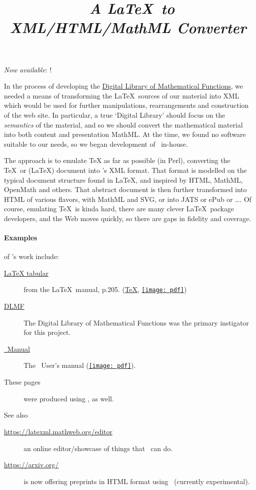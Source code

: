 \documentclass{article}
\title{\LaTeXML\ \emph{A \LaTeX\ to XML/HTML/MathML Converter}}
\newcommand{\PDFIcon}{\texttt{[image: pdf]}}
\begin{document}
\label{top}
\maketitle

\emph{Now available}:  !

In the process of developing the
\href{https://dlmf.nist.gov/}{Digital Library of Mathematical Functions},
we needed a means of transforming
the \LaTeX\ sources of our material into XML which would be used
for further manipulations, rearrangements and construction of the web site.
In particular, a true `Digital Library' should focus on the \emph{semantics}
of the material, and so we should convert the mathematical material into both
content and presentation MathML.
At the time, we found no software suitable to our needs, so we began
development of \LaTeXML\ in-house.  

The approach is to emulate TeX as far as possible (in Perl), converting
the \TeX\ or (\LaTeX) document into \LaTeXML's XML format. That format
is modelled on the typical document structure found in \LaTeX, and inspired by
HTML, MathML, OpenMath and others.  That abstract document is then further
transformed into HTML of various flavors, with MathML and SVG,
or into JATS or ePub or \ldots.
Of course, emulating \TeX\ is kinda hard,
there are many clever \LaTeX\ package developers,
and the Web moves quickly,
so there are gaps in fidelity and coverage.

\paragraph*{Examples} of \LaTeXML's work include:
%
\begin{description}
\item[\href{examples/tabular/tabular.html}{LaTeX tabular}]
    from the \LaTeX\ manual, p.205.
    (\href{examples/tabular/tabular.tex}{\TeX},
     \href{examples/tabular/tabular.pdf}{\PDFIcon})
\item[\href{https://dlmf.nist.gov/}{DLMF}]
   The Digital Library of Mathematical Functions was the
   primary instigator for this project.
\item[\href{manual/}{\LaTeXML\ Manual}]
   The \LaTeXML\ User's manual (\href{manual.pdf}{\PDFIcon}).
\item[These pages] were produced using \LaTeXML, as well.
\end{description}
See also
\begin{description}
\item[\url{https://latexml.mathweb.org/editor}] an online editor/showcase
  of things that \LaTeXML\ can do.
\item[\url{https://arxiv.org/}] is now offering preprints in HTML format using \LaTeXML\
 (currently experimental).
\end{description}
\end{document}
